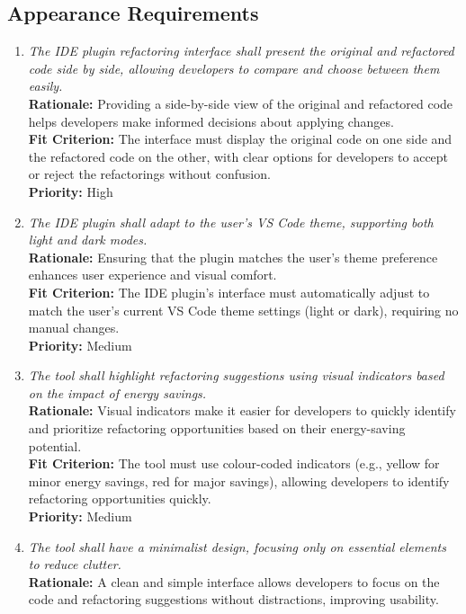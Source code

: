 \documentclass[12pt]{article}
\begin{document}
\subsection{Appearance Requirements}
\begin{enumerate}[label=LFR-AP \arabic*., wide=0pt, leftmargin=*]
    \item \emph{The IDE plugin refactoring interface shall present the original and refactored code side by side, allowing developers to compare and choose between them easily.}\\
    {\bf Rationale:} Providing a side-by-side view of the original and refactored code helps developers make informed decisions about applying changes.\\
    {\bf Fit Criterion:} The interface must display the original code on one side and the refactored code on the other, with clear options for developers to accept or reject the refactorings without confusion.\\
    {\bf Priority:} High
    \item \emph{The IDE plugin shall adapt to the user’s VS Code theme, supporting both light and dark modes.}\\
    {\bf Rationale:} Ensuring that the plugin matches the user's theme preference enhances user experience and visual comfort.\\
    {\bf Fit Criterion:} The IDE plugin’s interface must automatically adjust to match the user’s current VS Code theme settings (light or dark), requiring no manual changes.\\
    {\bf Priority:} Medium
    \item \emph{The tool shall highlight refactoring suggestions using visual indicators based on the impact of energy savings.}\\
    {\bf Rationale:} Visual indicators make it easier for developers to quickly identify and prioritize refactoring opportunities based on their energy-saving potential.\\
    {\bf Fit Criterion:} The tool must use colour-coded indicators (e.g., yellow for minor energy savings, red for major savings), allowing developers to identify refactoring opportunities quickly.\\
    {\bf Priority:} Medium
    \item \emph{The tool shall have a minimalist design, focusing only on essential elements to reduce clutter.}\\
    {\bf Rationale:} A clean and simple interface allows developers to focus on the code and refactoring suggestions without distractions, improving usability.\\

\end{enumerate}
\end{document}

